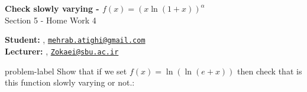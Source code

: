 	






		\begin{Large}
		\textsf{\textbf{Check slowly varying - $f(x) = (x\ln(1+x))^\alpha$}}\\
		Section 5 - Home Work 4
	\end{Large}
	
	\vspace{1ex}
	
	\textsf{\textbf{Student:}} , \href{mailto:mehrab.atighi@gmail.com}{\texttt{mehrab.atighi@gmail.com}}\\
	\textsf{\textbf{Lecturer:}} , \href{mailto:Zokaei@sbu.ac.ir}{\texttt{Zokaei@sbu.ac.ir}}
	
	
	\vspace{2ex}
	
	\begin{problem}{}{problem-label}
		Show that if we set $f(x) = \ln(\ln(e+x))$ then check that is this function slowly varying or not.\cite{Embrechts.etal1997}:
	\end{problem}
	
